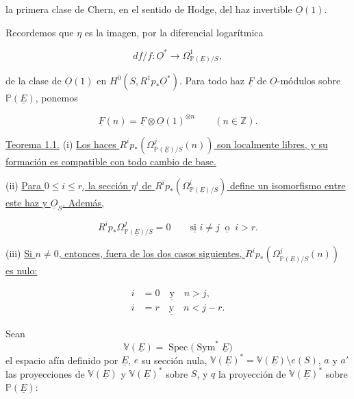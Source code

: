 la primera clase de Chern, en el sentido de Hodge, del haz invertible
$\underline O(1)$.

\pageoriginale

Recordemos que $\eta$ es la imagen, por la diferencial logarítmica

\begin{equation*}
df/f:\underline O^*\longrightarrow
\Omega^1_{\mathbb P(\underline E)/S},
\end{equation*}

de la clase de $\underline O(1)$ en $H^0(S,R^1p_*\underline O^*)$.
Para todo haz $\underline F$ de $\underline O$-módulos sobre
$\mathbb P(\underline E)$, ponemos

\begin{equation*}
\underline F(n)=\underline F\otimes\underline O(1)^{\otimes n}
\qquad(n\in\mathbb Z).
\end{equation*}

\medskip
\noindent\underline{Teorema 1.1.}\quad
(i) \underline{Los haces
$R^ip_*(\Omega^j_{\mathbb P(\underline E)/S}(n))$ son localmente libres, y
su formación es compatible con todo cambio de base.}

(ii) \underline{Para $0\leq i\leq r$, la sección $\eta^i$ de
$R^ip_*(\Omega^i_{\mathbb P(\underline E)/S})$ define un isomorfismo entre
este haz y $\underline O_S$. Además,}

\begin{equation*}
R^ip_*\Omega^j_{\mathbb P(\underline E)/S}=0
\qquad\underline{\text{si }}i\ne j\ \underline{\text{ o }}\ i>r.
\end{equation*}

(iii) \underline{Si $n\ne0$, entonces, fuera de los dos casos siguientes,
$R^ip_*(\Omega^j_{\mathbb P(\underline E)/S}(n))$ es nulo:}

\begin{align}
i&=0\quad\underline{\text{y}}\quad n>j,
  \tag{iii$_a$}\\
i&=r\quad\underline{\text{y}}\quad n<j-r.
  \tag{iii$_b$}
\end{align}

Sean
\[
\mathbb V(\underline E)=
\operatorname{Spec}\bigl(\operatorname{Sym}^*\underline E\bigr)
\]
el espacio afín definido por $\underline E$, $e$ su sección nula,
$\mathbb V(\underline E)^*=\mathbb V(\underline E)\setminus e(S)$, $a$ y
$a'$ las proyecciones de $\mathbb V(\underline E)$ y
$\mathbb V(\underline E)^*$ sobre $S$, y $q$ la proyección de
$\mathbb V(\underline E)^*$ sobre $\mathbb P(\underline E)$:


